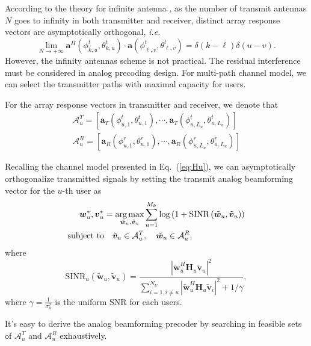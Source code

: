 \documentclass[10pt,journal,twocolumn,twoside]{IEEEtran}
\def\argmax{\mathop{\mbox{arg\,max}}}
\begin{document}
According to the theory for infinite antenna \cite{sun2015beam}, as the number of transmit antennas $N$ goes to infinity in both transmitter and receiver, distinct array response vectors are asymptotically orthogonal, {\em i.e.}
\begin{equation}\label{Eq:assumption}
\lim_{N\rightarrow +\infty} \bm{a}^{H}(\phi^t_{k,u},\theta^t_{k,u}) \cdot\bm{a}(\phi^t_{\ell,v},\theta^t_{\ell,v})=\delta(k-\ell)\delta(u-v).
\end{equation}
However, the infinity antennas scheme is not practical. The residual interference must be considered in analog precoding design.  For multi-path channel model, we can select the transmitter paths  with maximal capacity for users.

For the array response vectors in transmitter and receiver, we denote that
\begin{align}
\mathcal{A}^T_{u} = \left[\bm{a}_{T}(\phi^t_{{u,1}},\theta^t_{{u,1}}),\cdots,\bm{a}_{T}(\phi^t_{{u,L_{u}}},\theta^t_{{u,L_{u}}})\right]
\nonumber \\
\mathcal{A}^R_{u} = \left[\bm{a}_{R}(\phi^r_{{u,1}},\theta^r_{{u,1}}),\cdots,\bm{a}_{R}(\phi^r_{{u,L_{u}}},\theta^r_{{u,L_{u}}})\right]
\end{align}

Recalling the channel model presented in Eq.~(\ref{eq:Hu}), we can asymptotically orthogonalize transmitted signals by setting the transmit analog beamforming vector for the $u$-th user as
\begin{align}\label{eq:group-scheduling}
\bm{{w}}^*_{u}, \bm{{v}}^*_{u} &=\underset{\tilde{\bm w }_{u}, \tilde{\bm v}_{u}}{\argmax}
\sum_{u=1}^{M_k}\log\left(1+ \text{SINR}\left(\tilde{\bm w}_{u}, \tilde{\bm v}_{u}\right)\right)  \\ \nonumber
\text{subject to}&\quad \tilde{\bm v}_{u}\in \mathcal{A}^T_{u},\quad \tilde{\bm w}_{u}\in \mathcal{A}^R_{u},
\end{align}
where 
\begin{equation}\label{SINR} 
\text{SINR}_u\left(\tilde{\bm w}_{u}, \tilde{\bm v}_{u}\right) = \frac{|\tilde{\bm w}^H_{u} \bm{H}_{u} \tilde{\bm v}_{u}|^2}{\displaystyle\sum_{i=1,i\neq u}^{N_U}|\tilde{\bm w}^H_{u} \bm{H}_{u}\tilde{\bm {v}}_i|^2 + 1/\gamma },
\end{equation}
where $\gamma = \frac{1}{\sigma_{u}^2}$ is the uniform SNR for each users. 

It's easy to derive the analog beamforming precoder by searching in feasible sets of $\mathcal{A}^T_{u}$ and $\mathcal{A}^R_{u}$ exhaustively.
\end{document}
